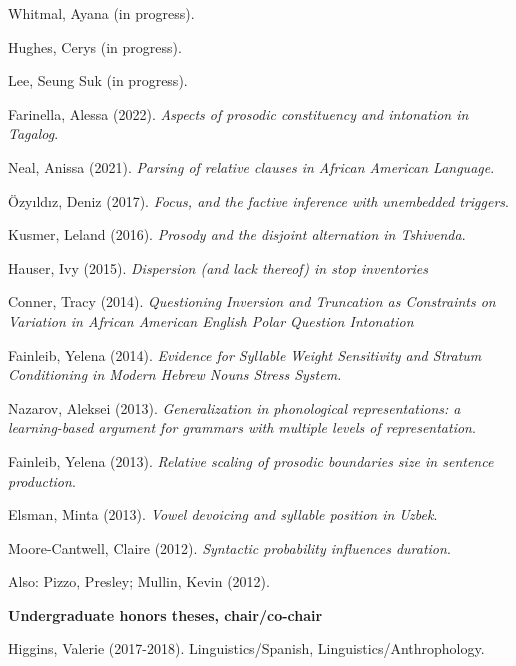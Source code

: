 \documentclass[10pt]{article}
\newcommand{\halfblankline}{\quad\vspace{-0.5\baselineskip}\pagebreak[3]}
\begin{document}
\begin{innerlist}
  \item Whitmal, Ayana (in progress).
  \item Hughes, Cerys (in progress).
  \item Lee, Seung Suk (in progress).
\item Farinella, Alessa (2022). \emph{Aspects of prosodic constituency and intonation in Tagalog}.
  \item Neal, Anissa (2021). \emph{Parsing of relative clauses in {A}frican {A}merican {L}anguage}. 
  \item \"{O}zy\i{}ld\i{}z, Deniz (2017). \emph{Focus, and the factive inference with unembedded triggers}.
    \item Kusmer, Leland (2016). \emph{Prosody and the disjoint alternation in Tshivenda}. 
    \item Hauser, Ivy (2015). \emph{Dispersion (and lack thereof) in stop inventories}
    \item Conner, Tracy (2014). \emph{Questioning Inversion and
        Truncation as Constraints on Variation in African American English Polar Question Intonation}
    \item Fainleib, Yelena (2014). \emph{Evidence for Syllable Weight Sensitivity and Stratum Conditioning in Modern Hebrew Nouns Stress System.}
    \item Nazarov, Aleksei (2013). \emph{Generalization in phonological representations: a learning-based argument for grammars with multiple levels of representation}.
    \item Fainleib, Yelena (2013). \emph{Relative scaling of prosodic boundaries size in sentence production}. 
    \item Elsman, Minta (2013). \emph{Vowel devoicing and syllable position in Uzbek}.
    \item Moore-Cantwell, Claire (2012). \emph{Syntactic probability
        influences duration}.
    \item Also: Pizzo, Presley; Mullin, Kevin (2012).
\end{innerlist}

\halfblankline

\textbf{Undergraduate honors theses, chair/co-chair} \hfill 
\begin{innerlist}
    \item Higgins, Valerie (2017-2018). Linguistics/Spanish, Linguistics/Anthrophology. 
\end{innerlist}
\end{document}
